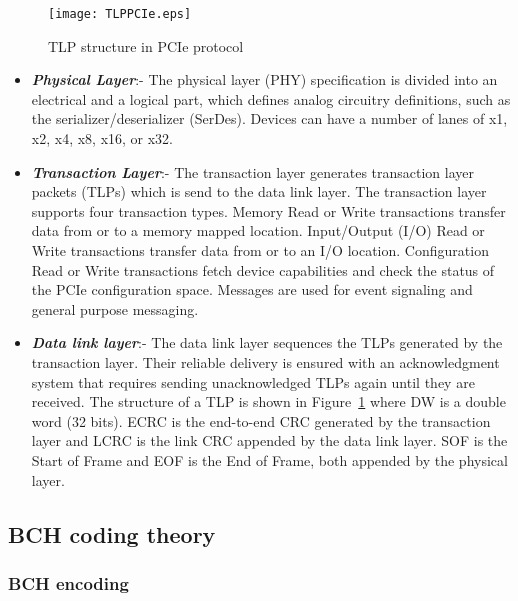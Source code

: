 \documentclass[10pt, conference, compsocconf]{IEEEtran}
\begin{document}
\begin{figure}[h]
\centering
\texttt{[image: TLPPCIe.eps]}
\vspace*{-8pt}
\caption{TLP structure in PCIe protocol}
\label{fig:TLPPCIe}
\end{figure}
\begin{itemize}
\item \textit{\textbf{Physical Layer}}:- The physical layer (PHY) specification is divided into an electrical and a logical part, which defines analog circuitry definitions, such as the serializer/deserializer (SerDes). Devices can have a number of lanes of x1, x2, x4, x8, x16, or x32.
\item \textit{\textbf{Transaction Layer}}:- 
The transaction layer generates transaction layer packets (TLPs) which is send to the data link layer. The transaction layer supports four transaction types. Memory Read or Write transactions transfer data from or to a memory mapped location. Input/Output (I/O) Read or Write transactions transfer data from or to an I/O location. Configuration Read or Write transactions fetch device capabilities and check the status of the PCIe configuration space. Messages are used for event signaling and general purpose messaging.
\item \textit{\textbf{ Data link layer}}:- 
The data link layer sequences the TLPs generated by the transaction layer. Their reliable delivery is ensured with an acknowledgment system that requires sending unacknowledged TLPs again until they are received. The structure of a TLP is shown in Figure~\ref{fig:TLPPCIe} where DW is a double word (32 bits). ECRC is the end-to-end CRC generated by the transaction layer and LCRC is the link CRC appended by the data link layer. SOF is the Start of Frame and EOF is the End of Frame, both appended by the physical layer.
\end{itemize}

\subsection{BCH coding theory} \label{BCH_Coding}
\subsubsection{BCH encoding}
\end{document}
